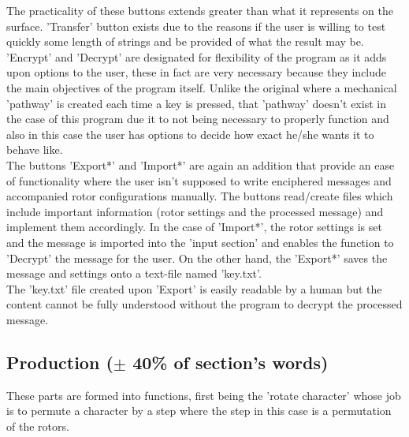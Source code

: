 \documentclass[conference,compsoc]{IEEEtran}
\begin{document}
The practicality of these buttons extends greater than what it represents on the surface. 'Transfer' button exists due to the reasons if the user is willing to test quickly some length of strings and be provided of what the result may be.\\

'Encrypt' and 'Decrypt' are designated for flexibility of the program as it adds upon options to the user, these in fact are very necessary because they include the main objectives of the program itself. Unlike the original where a mechanical 'pathway' is created each time a key is pressed, that 'pathway' doesn't exist in the case of this program due it to not being necessary to properly function and also in this case the user has options to decide how exact he/she wants it to behave like.\\

The buttons 'Export*' and 'Import*' are again an addition that provide an ease of functionality where the user isn't supposed to write enciphered messages and accompanied rotor configurations manually. The buttons read/create files which include important information (rotor settings and the processed message) and implement them accordingly. In the case of 'Import*', the rotor settings is set and the message is imported into the 'input section' and enables the function to 'Decrypt' the message for the user. On the other hand, the 'Export*' saves the message and settings onto a text-file named 'key.txt'.\\

The 'key.txt' file created upon 'Export' is easily readable by a human but the content cannot be fully understood without the program to decrypt the processed message.\\ 

\subsection{Production ($\pm$ 40\% of section's words)}

These parts are formed into functions, first being the 'rotate character' whose job is to permute a character by a step where the step in this case is a permutation of the rotors.\\
\end{document}

